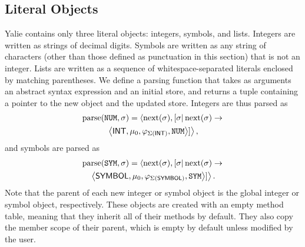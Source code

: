 \documentclass[twocolumn]{article}
\begin{document}
\subsection*{Literal Objects}
Yalie contains only three literal objects: integers, symbols, and
lists. Integers are written as strings of decimal digits. Symbols are
written as any string of characters (other than those defined as
punctuation in this section) that is not an integer. Lists are written
as a sequence of whitespace-separated literals enclosed by matching
parentheses. We define a parsing function that takes as arguments an
abstract syntax expression and an initial store, and returns a tuple
containing a pointer to the new object and the updated store.
Integers are thus parsed as
\begin{multline*}
\operatorname{parse}(\texttt{NUM},\sigma) =
\left<\operatorname{next}(\sigma),[\sigma|\operatorname{next}(\sigma) \rightarrow\right. \\
\left.\left<\mathsf{INT}, \mu_0, \varphi_{\Sigma(\mathsf{INT})}, \texttt{NUM}\right>]\right>,
\end{multline*}
and symbols are parsed as
\begin{multline*}
  \operatorname{parse}(\texttt{SYM},\sigma) =
  \left<\operatorname{next}(\sigma),[\sigma|\operatorname{next}(\sigma) \rightarrow\right. \\
\left.\left<\mathsf{SYMBOL}, \mu_0, \varphi_{\Sigma(\mathsf{SYMBOL})},
  \texttt{SYM}\right>]\right>.
\end{multline*}
Note that the parent of each new integer or symbol object is the
global integer or symbol object, respectively. These objects are
created with an empty method table, meaning that they inherit all of
their methods by default. They also copy the member scope of their
parent, which is empty by default unless modified by the user.
\end{document}
